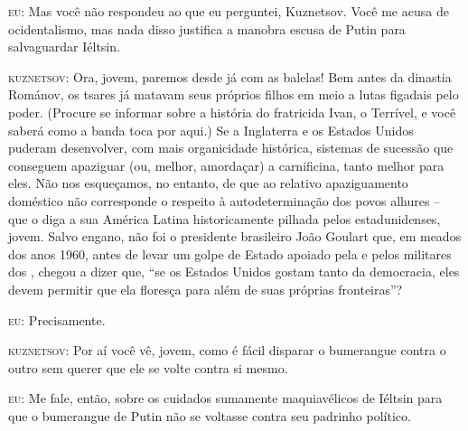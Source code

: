 \textsc{eu:} Mas você não respondeu ao que eu perguntei, Kuznetsov. Você
me acusa de ocidentalismo, mas nada disso justifica a manobra escusa de
Putin para salvaguardar Iéltsin.

\textsc{kuznetsov:} Ora, jovem, paremos desde já com as balelas! Bem
antes da dinastia Románov, os tsares já matavam seus próprios filhos em
meio a lutas figadais pelo poder. (Procure se informar sobre a história
do fratricida Ivan, o Terrível, e você saberá como a banda toca por
aqui.) Se a Inglaterra e os Estados Unidos puderam desenvolver, com mais
organicidade histórica, sistemas de sucessão que conseguem apaziguar
(ou, melhor, amordaçar) a carnificina, tanto melhor para eles. Não nos
esqueçamos, no entanto, de que ao relativo apaziguamento doméstico não
corresponde o respeito à autodeterminação dos povos alhures -- que o
diga a sua América Latina historicamente pilhada pelos estadunidenses,
jovem. Salvo engano, não foi o presidente brasileiro João Goulart que,
em meados dos anos 1960, antes de levar um golpe de Estado apoiado pela
 e pelos militares dos , chegou a dizer que, ``se os Estados
Unidos gostam tanto da democracia, eles devem permitir que ela floresça
para além de suas próprias fronteiras''?

\textsc{eu:} Precisamente.

\textsc{kuznetsov:} Por aí você vê, jovem, como é fácil disparar o
bumerangue contra o outro sem querer que ele se volte contra si mesmo.

\textsc{eu:} Me fale, então, sobre os cuidados sumamente maquiavélicos
de Iéltsin para que o bumerangue de Putin não se voltasse contra seu
padrinho político.

